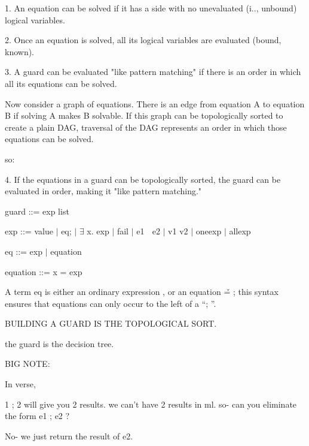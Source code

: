\documentclass{article}
\begin{document}
1. An equation can be solved if it has a side with no unevaluated (i.\expr.,
unbound) logical variables. 

2. Once an equation is solved, all its logical variables are evaluated (bound,
known). 

3. A guard can be evaluated "like pattern matching" if there is an order in
which all its equations can be solved. 

Now consider a graph of equations.  There is an edge from
equation A to equation B if solving A makes B solvable.  If this graph can 
be topologically sorted to create a plain DAG, traversal of the DAG represents
an order in which those equations can be solved. 

so: 

4. If the equations in a guard can be topologically sorted, the guard can be 
   evaluated in order, making it "like pattern matching." 

guard ::= exp list 

exp ::= value $\vert$ eq; \expr $\vert$ $\exists$ x. exp $\vert$ fail $\vert$ e1
\choice $\;$ e2 $\vert$ v1 v2 $\vert$ one{exp} $\vert$ all{exp}

eq ::= exp $\vert$ equation 

equation ::= x = exp 


A term eq is either an ordinary expression \expr, or an equation \v = \expr; this syntax
ensures that equations can only occur to the left of a “; ”. 


BUILDING A GUARD IS THE TOPOLOGICAL SORT. 

the guard is the decision tree. 

BIG NOTE: 

In verse, 

1 ; 2 will give you 2 results. we can't have 2 results in ml. 
so- can you eliminate the form e1 ; e2 ? 

No- we just return the result of e2. 

\end{document}
